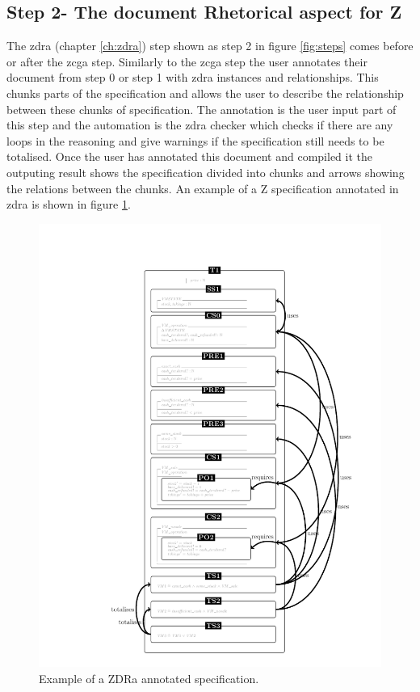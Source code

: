 \subsection{Step 2- The document Rhetorical aspect for Z}

The \gls{zdra} (chapter \ref{ch:zdra}) step shown as step 2 in figure \ref{fig:steps} comes before or after the \gls{zcga} step. Similarly to the \gls{zcga} step the user annotates their document from step 0 or step 1 with \gls{zdra} instances and relationships. This chunks parts of the specification and allows the user to describe the relationship between these chunks of specification. The annotation is the user input part of this step and the automation is the \gls{zdra} checker which checks if there are any loops in the reasoning and give warnings if the specification still needs to be totalised. Once the user has annotated this document and compiled it the outputing result shows the specification divided into chunks and arrows showing the relations between the chunks. An example of a Z specification annotated in \gls{zdra} is shown in figure \ref{fig:zdraexample}.

\begin{figure}[H]
 \begin{center}
 \includegraphics [scale=0.25]{Figures/Design/zdracomp.png}
 \caption{Example of a ZDRa annotated specification.}
 \label{fig:zdraexample}
\end{center}
\end{figure} 

